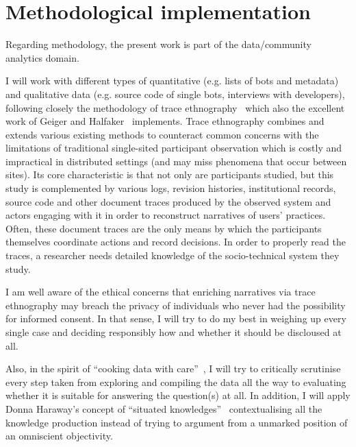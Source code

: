 \documentclass[pdftex,a4paper,11pt]{scrartcl}
\begin{document}
\section{Methodological implementation}
Regarding methodology, the present work is part of the data/community analytics domain. %

I will work with different types of quantitative (e.g. lists of bots and metadata) and qualitative data (e.g. source code of single bots, interviews with developers), following closely the methodology of trace ethnography~\cite{GeiRib2011} which also the excellent work of Geiger and Halfaker~\cite{GeiHal2017} implements.
Trace ethnography combines and extends various existing methods to counteract common concerns with the limitations of traditional single-sited participant observation which is costly and impractical in distributed settings (and may miss phenomena that occur between sites).
Its core characteristic is that not only are participants studied, but this study is complemented by various logs, revision histories, institutional records, source code and other document traces produced by the observed system and actors engaging with it in order to reconstruct narratives of users' practices.
Often, these document traces are the only means by which the participants themselves coordinate actions and record decisions.
In order to properly read the traces, a researcher needs detailed knowledge of the socio-technical system they study.

I am well aware of the ethical concerns that enriching narratives via trace ethnography may breach the privacy of individuals who never had the possibility for informed consent.
In that sense, I will try to do my best in weighing up every single case and deciding responsibly how and whether it should be discloused at all.

Also, in the spirit of ``cooking data with care''~\cite{GeiHal2017}, I will try to critically scrutinise every step taken from exploring and compiling the data all the way to evaluating whether it is suitable for answering the question(s) at all.
In addition, I will apply Donna Haraway's concept of ``situated knowledges''~\cite{Haraway1988} contextualising all the knowledge production instead of trying to argument from a unmarked position of an omniscient objectivity.
\end{document}
